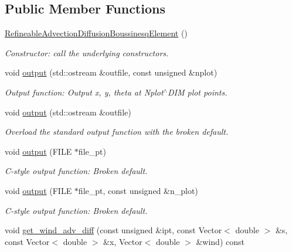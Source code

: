 \subsection*{Public Member Functions}
\begin{DoxyCompactItemize}
\item 
\hyperlink{classoomph_1_1RefineableAdvectionDiffusionBoussinesqElement_a26f91df92dc910d525ec920b9d674046}{Refineable\+Advection\+Diffusion\+Boussinesq\+Element} ()
\begin{DoxyCompactList}\small\item\em Constructor\+: call the underlying constructors. \end{DoxyCompactList}\item 
void \hyperlink{classoomph_1_1RefineableAdvectionDiffusionBoussinesqElement_a91bd582775205de08b7c0092acc82a0d}{output} (std\+::ostream \&outfile, const unsigned \&nplot)
\begin{DoxyCompactList}\small\item\em Output function\+: Output x, y, theta at Nplot$^\wedge$\+D\+IM plot points. \end{DoxyCompactList}\item 
void \hyperlink{classoomph_1_1RefineableAdvectionDiffusionBoussinesqElement_ae56c984aaa1aeddf1f458e700ffbe6a1}{output} (std\+::ostream \&outfile)
\begin{DoxyCompactList}\small\item\em Overload the standard output function with the broken default. \end{DoxyCompactList}\item 
void \hyperlink{classoomph_1_1RefineableAdvectionDiffusionBoussinesqElement_ac8fa2a491b9c5bda7bcfdd93d0a00b11}{output} (F\+I\+LE $\ast$file\+\_\+pt)
\begin{DoxyCompactList}\small\item\em C-\/style output function\+: Broken default. \end{DoxyCompactList}\item 
void \hyperlink{classoomph_1_1RefineableAdvectionDiffusionBoussinesqElement_a61bcd2e4a50f8e157ca40572b384dcee}{output} (F\+I\+LE $\ast$file\+\_\+pt, const unsigned \&n\+\_\+plot)
\begin{DoxyCompactList}\small\item\em C-\/style output function\+: Broken default. \end{DoxyCompactList}\item 
void \hyperlink{classoomph_1_1RefineableAdvectionDiffusionBoussinesqElement_a8279f67a0b2150be8f80d51c647f5e9e}{get\+\_\+wind\+\_\+adv\+\_\+diff} (const unsigned \&ipt, const Vector$<$ double $>$ \&s, const Vector$<$ double $>$ \&x, Vector$<$ double $>$ \&wind) const

\end{DoxyCompactItemize}
